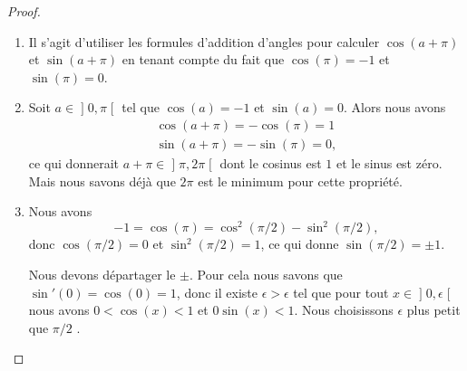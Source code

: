 \begin{proof}
\begin{enumerate}
            Mais d'un autre côté, le nombre \( 2\pi\) est le plus petit \( T\) vérifiant \( \cos(T)=1\), \( \sin(T)=0\). Donc avoir \( \cos(\pi)=1\) n'est pas possible. Nous concluons
            \begin{subequations}
                \begin{numcases}{}
                    \cos(\pi)=-1\\
                    \sin(\pi)=0.
                \end{numcases}
            \end{subequations}
        \item
            Il s'agit d'utiliser les formules d'addition d'angles pour calculer \( \cos(a+\pi)\) et \( \sin(a+\pi)\) en tenant compte du fait que \( \cos(\pi)=-1\) et \( \sin(\pi)=0\).
        \item
        Soit \( a\in\mathopen] 0 , \pi \mathclose[\) tel que \( \cos(a)=-1\) et \( \sin(a)=0\). Alors nous avons
            \begin{subequations}
                \begin{align}
                    \cos(a+\pi)=-\cos(\pi)=1\\
                    \sin(a+\pi)=-\sin(\pi)=0,
                \end{align}
            \end{subequations}
        ce qui donnerait \( a+\pi\in\mathopen] \pi , 2\pi \mathclose[\) dont le cosinus est \( 1\) et le sinus est zéro. Mais nous savons déjà que \( 2\pi\) est le minimum pour cette propriété.
        \item
            Nous avons
            \begin{equation}
                -1=\cos(\pi)=\cos^2(\pi/2)-\sin^2(\pi/2),
            \end{equation}
            donc \( \cos(\pi/2)=0\) et \( \sin^2(\pi/2)=1\), ce qui donne \( \sin(\pi/2)=\pm 1\).

        Nous devons départager le \( \pm\). Pour cela nous savons que \( \sin'(0)=\cos(0)=1\), donc il existe \( \epsilon>\epsilon\) tel que pour tout \( x\in\mathopen] 0 , \epsilon \mathclose[\) nous avons \( 0<\cos(x)<1\) et \( 0\sin(x)<1\). Nous choisissons \( \epsilon\) plus petit que \( \pi/2\) .  
            

\end{enumerate}
\end{proof}

